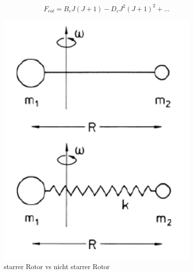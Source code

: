 \begin{itemize}
\begin{itemize}
                \begin{equation}
                   F_{rot}=B_eJ(J+1)-D_eJ^2(J+1)^2+...
                   \label{RotE_nichtstarr}
                    \end{equation}
    \begin{figure}[H]
    \centering
   \begin{minipage}[b]{.3\linewidth}
      \includegraphics[width=\linewidth]{resources/16-03-2012/StarrervsnichtstarrerRotor.png}
      \caption{starrer Rotor vs nicht starrer Rotor}
   \end{minipage}
   \hspace{.1\linewidth}
   \begin{minipage}[b]{.3\linewidth} 

\end{minipage}
\end{figure}
\end{itemize}
\end{itemize}
